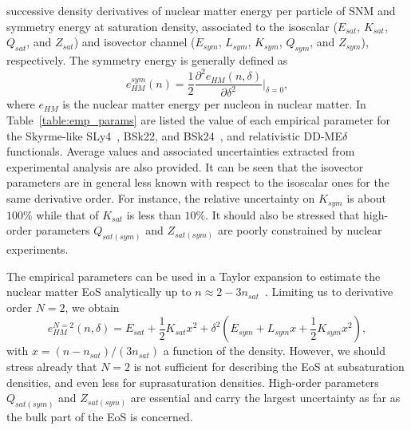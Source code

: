 successive density derivatives of nuclear matter energy per particle of SNM 
and symmetry energy at saturation density, associated to the isoscalar
($E_{sat}$, $K_{sat}$, $Q_{sat}$, and $Z_{sat}$) and isovector channel ($E_{sym}$,
$L_{sym}$, $K_{sym}$, $Q_{sym}$, and $Z_{sym}$), respectively. 
The symmetry energy is generally defined as
%
\begin{equation}
  e_{HM}^{sym}(n) = \frac{1}{2}\frac{\partial^2 e_{HM}(n,\delta)}{\partial
  \delta^2}\bigg|_{\delta=0},\label{eq:esym}
\end{equation}
%
where $e_{HM}$ is the nuclear matter energy per nucleon in nuclear matter. In
Table~\ref{table:emp_params} are listed the value of each empirical parameter
for the Skyrme-like SLy4~\cite{Chabanat1998}, BSk22, and
BSk24~\cite{Goriely2013}, and relativistic
DD-ME$\delta$~\cite{RocaMaza2011} functionals. Average values and associated
uncertainties extracted from experimental analysis are also provided. It can be
seen that the isovector parameters are in general less known with respect to
the isoscalar ones for the same derivative order. For instance, the relative
uncertainty on $K_{sym}$ is about $100\%$ while that of $K_{sat}$ is less than
$10\%$. It should also be stressed that high-order parameters $Q_{sat(sym)}$
and $Z_{sat(sym)}$ are poorly constrained by nuclear experiments.

The empirical parameters can be used in a Taylor expansion to estimate the
nuclear matter EoS analytically up to 
$n \approx 2-3n_{sat}$~\cite{Margueron2018a,Margueron2018b}. Limiting us to 
derivative order $N=2$, we obtain
%
\begin{equation}
  e^{N=2}_{HM}(n,\delta) = E_{sat} + \frac{1}{2}K_{sat}x^2 
  + \delta^2 (E_{sym} + L_{sym}x +\frac{1}{2}K_{sym}x^2),\label{eq:mmn2}
\end{equation}
%
with $x = (n-n_{sat})/(3n_{sat})$ a function of the density. {However, we 
  should stress already that $N=2$ is not sufficient for describing the EoS at 
  subsaturation densities, and even less for suprasaturation densities. 
  High-order parameters $Q_{sat(sym)}$ and $Z_{sat(sym)}$ are essential and 
  carry the largest uncertainty as far as the bulk part of the EoS is 
concerned.}

